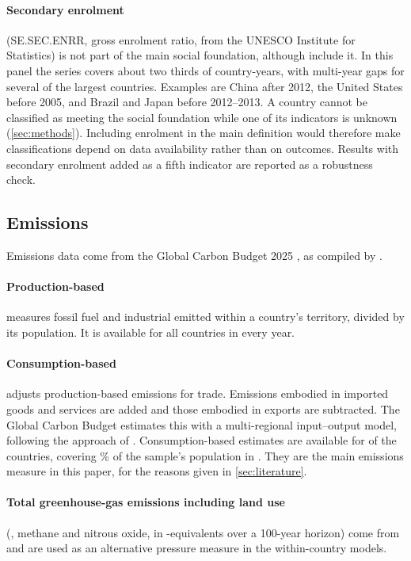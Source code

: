 \paragraph{Secondary enrolment} (SE.SEC.ENRR, gross enrolment ratio, from the UNESCO Institute for Statistics) is not part of the main social foundation, although \citet{fanning2022} include it. In this panel the series covers about two thirds of country-years, with multi-year gaps for several of the largest countries. Examples are China after 2012, the United States before 2005, and Brazil and Japan before 2012--2013. A country cannot be classified as meeting the social foundation while one of its indicators is unknown (\cref{sec:methods}). Including enrolment in the main definition would therefore make classifications depend on data availability rather than on outcomes. Results with secondary enrolment added as a fifth indicator are reported as a robustness check.

\subsection{Emissions}

Emissions data come from the Global Carbon Budget 2025 \citep{friedlingstein2026}, as compiled by \citet{owid2025co2}.

\paragraph{Production-based \COtwo{}} measures fossil fuel and industrial \COtwo{} emitted within a country's territory, divided by its population. It is available for all \nNCountries{} countries in every year.

\paragraph{Consumption-based \COtwo{}} adjusts production-based emissions for trade. Emissions embodied in imported goods and services are added and those embodied in exports are subtracted. The Global Carbon Budget estimates this with a multi-regional input--output model, following the approach of \citet{peters2011}. Consumption-based estimates are available for \nNCons{} of the \nNCountries{} countries, covering \nConsPopShare\% of the sample's population in \nLastYear. They are the main emissions measure in this paper, for the reasons given in \cref{sec:literature}.

\paragraph{Total greenhouse-gas emissions including land use} (\COtwo, methane and nitrous oxide, in \COtwo-equivalents over a 100-year horizon) come from \citet{jones2023} and are used as an alternative pressure measure in the within-country models.

